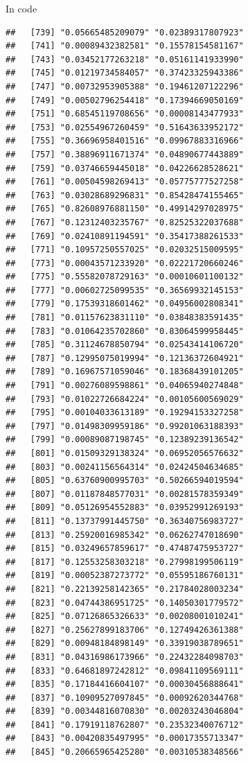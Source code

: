\documentclass[ignorenonframetext,]{beamer}
\begin{document}
\begin{frame}[fragile]{In code}
\begin{verbatim}
##   [739] "0.05665485209079" "0.02389317807923"
##   [741] "0.00089432382581" "0.15578154581167"
##   [743] "0.03452177263218" "0.05161141933990"
##   [745] "0.01219734584057" "0.37423325943386"
##   [747] "0.00732953905388" "0.19461207122296"
##   [749] "0.00502796254418" "0.17394669050169"
##   [751] "0.68545119708656" "0.00008143477933"
##   [753] "0.02554967260459" "0.51643633952172"
##   [755] "0.36696958401516" "0.09967883316966"
##   [757] "0.38896911671374" "0.04890677443889"
##   [759] "0.03746659445018" "0.04226628528621"
##   [761] "0.00504598269413" "0.05775777527258"
##   [763] "0.03028689296831" "0.85428474155465"
##   [765] "0.82608976881150" "0.49914297028975"
##   [767] "0.12312403235767" "0.82525322037688"
##   [769] "0.02410891194591" "0.35417388261533"
##   [771] "0.10957250557025" "0.02032515009595"
##   [773] "0.00043571233920" "0.02221720660246"
##   [775] "0.55582078729163" "0.00010601100132"
##   [777] "0.00602725099535" "0.36569932145153"
##   [779] "0.17539318601462" "0.04956002808341"
##   [781] "0.01157623831110" "0.03848383591435"
##   [783] "0.01064235702860" "0.83064599958445"
##   [785] "0.31124678850794" "0.02543414106720"
##   [787] "0.12995075019994" "0.12136372604921"
##   [789] "0.16967571059046" "0.18368439101205"
##   [791] "0.00276089598861" "0.04065940274848"
##   [793] "0.01022726684224" "0.00105600569029"
##   [795] "0.00104033613189" "0.19294153327258"
##   [797] "0.01498309959186" "0.99201063188393"
##   [799] "0.00089087198745" "0.12389239136542"
##   [801] "0.01509329138324" "0.06952056576632"
##   [803] "0.00241156564314" "0.02424504634685"
##   [805] "0.63760900995703" "0.50266594019594"
##   [807] "0.01187848577031" "0.00281578359349"
##   [809] "0.05126954552883" "0.03952991269193"
##   [811] "0.13737991445750" "0.36340756983727"
##   [813] "0.25920016985342" "0.06262747018690"
##   [815] "0.03249657859617" "0.47487475953727"
##   [817] "0.12553258303218" "0.27998199506119"
##   [819] "0.00052387273772" "0.05595186760131"
##   [821] "0.22139258142365" "0.21784028003234"
##   [823] "0.04744386951725" "0.14050301779572"
##   [825] "0.07126865326633" "0.00208001010241"
##   [827] "0.25627899183706" "0.12749426361388"
##   [829] "0.00948184898149" "0.33919038789651"
##   [831] "0.04316986173966" "0.22432284098703"
##   [833] "0.64681897242812" "0.09841109569111"
##   [835] "0.17184416604107" "0.00030456888641"
##   [837] "0.10909527097845" "0.00092620344768"
##   [839] "0.00344816070830" "0.00203243046804"
##   [841] "0.17919118762807" "0.23532340076712"
##   [843] "0.00420835497995" "0.00017355713347"
##   [845] "0.20665965425280" "0.00310538348566"

\end{verbatim}
\end{frame}
\end{document}
